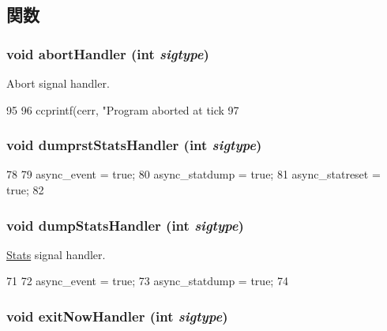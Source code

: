\subsection{関数}
\hypertarget{init_8hh_a285bd5faf9d027a414cc6c68c1af574c}{
\subsubsection[{abortHandler}]{\setlength{\rightskip}{0pt plus 5cm}void abortHandler (int {\em sigtype})}}
\label{init_8hh_a285bd5faf9d027a414cc6c68c1af574c}


Abort signal handler. 


\begin{DoxyCode}
95 {
96     ccprintf(cerr, "Program aborted at tick %
97 }
\end{DoxyCode}
\hypertarget{init_8hh_aa15513491cd8b43dacf2680124c1feec}{
\subsubsection[{dumprstStatsHandler}]{\setlength{\rightskip}{0pt plus 5cm}void dumprstStatsHandler (int {\em sigtype})}}
\label{init_8hh_aa15513491cd8b43dacf2680124c1feec}



\begin{DoxyCode}
78 {
79     async_event = true;
80     async_statdump = true;
81     async_statreset = true;
82 }
\end{DoxyCode}
\hypertarget{init_8hh_a022a6cffd1e62434c8d2db231132ebc5}{
\subsubsection[{dumpStatsHandler}]{\setlength{\rightskip}{0pt plus 5cm}void dumpStatsHandler (int {\em sigtype})}}
\label{init_8hh_a022a6cffd1e62434c8d2db231132ebc5}


\hyperlink{namespaceStats}{Stats} signal handler. 


\begin{DoxyCode}
71 {
72     async_event = true;
73     async_statdump = true;
74 }
\end{DoxyCode}
\hypertarget{init_8hh_a82498a29f5c97cedefc027aef34c198a}{
\subsubsection[{exitNowHandler}]{\setlength{\rightskip}{0pt plus 5cm}void exitNowHandler (int {\em sigtype})}}
\label{init_8hh_a82498a29f5c97cedefc027aef34c198a}


